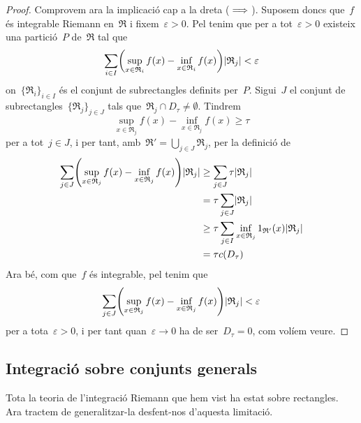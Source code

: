 \documentclass[../../main.tex]{subfiles}
\begin{document}
\begin{theorem}
\begin{proof}
            Comprovem ara la implicació cap a la dreta (\(\implies\)).
            Suposem doncs que~\(f\) és integrable Riemann en~\(\mathfrak{R}\) i fixem~\(\varepsilon>0\).
            Pel  tenim que per a tot~\(\varepsilon>0\) existeix una partició~\(P\) de~\(\mathfrak{R}\) tal que
            \[
                \sum_{i\in I}\left(\sup_{x\in \mathfrak{R}_{i}}f(x)-\inf_{x\in \mathfrak{R}_{i}}f(x)\right)\abs{\mathfrak{R}_{j}}<\varepsilon
            \]
            on~\(\{\mathfrak{R}_{i}\}_{i\in I}\) és el conjunt de subrectangles definits per~\(P\).
            Sigui~\(J\) el conjunt de subrectangles~\(\{\mathfrak{R}_{j}\}_{j\in J}\) tals que~\(\mathfrak{R}_{j}\cap D_{\tau}\neq\emptyset\).
            Tindrem
            \[
                \sup_{x\in \mathfrak{R}_{j}}f(x)-\inf_{x\in \mathfrak{R}_{j}}f(x)\geq\tau
            \]
            per a tot~\(j\in J\), i per tant, amb~\(\mathfrak{R}'=\bigcup_{j\in J}\mathfrak{R}_{j}\), per la definició de 
            \begin{align*}
                \sum_{j\in J}\left(\sup_{x\in \mathfrak{R}_{j}}f(x)-\inf_{x\in \mathfrak{R}_{j}}f(x)\right)\abs{\mathfrak{R}_{j}}&\geq\sum_{j\in J}\tau\abs{\mathfrak{R}_{j}}\\
                &=\tau\sum_{j\in J}\abs{\mathfrak{R}_{j}}\\
                &\geq\tau\sum_{j\in I}\inf_{x\in \mathfrak{R}_{j}}1_{\mathfrak{R}'}(x)\abs{\mathfrak{R}_{j}}\\
                &=\tau c(D_{\tau})
            \end{align*}
            Ara bé, com que~\(f\) és integrable, pel  tenim que
            \[
                \sum_{j\in J}\left(\sup_{x\in \mathfrak{R}_{j}}f(x)-\inf_{x\in \mathfrak{R}_{j}}f(x)\right)\abs{\mathfrak{R}_{j}}<\varepsilon
            \]
            per a tota~\(\varepsilon>0\), i per tant quan~\(\varepsilon\to0\) ha de ser~\(D_{\tau}=0\), com volíem veure.
        \end{proof}
    \end{theorem}
    \subsection{Integració sobre conjunts generals}
    \begin{note}
        Tota la teoria de l'integració Riemann que hem vist ha estat sobre rectangles.
        Ara tractem de generalitzar-la desfent-nos d'aquesta limitació.
    \end{note}
\end{document}
